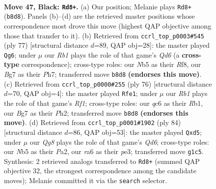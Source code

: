 \documentclass[11pt]{article}
\begin{document}
\clearpage

\begin{figure}[p]\centering
\begin{subfigure}{0.46\textwidth}\centering
\resizebox{\linewidth}{!}{%
\newchessgame
\chessboard[
  setfen={1r4k1/1r3pb1/R1Q5/1n2p1R1/4P3/3K4/3N2N1/6q1 b - - 5 47},
  showmover=false,
  pgfstyle=straightmove, color=movearrow, markmove={b8-d8}
]}
\caption{}
\end{subfigure}\hfill
\begin{subfigure}{0.46\textwidth}\centering
\resizebox{\linewidth}{!}{%
\newchessgame
\chessboard[
  setfen={1r3r1k/Q6p/3p4/4b3/7R/3q1PN1/5RKP/8 b - - 5 39},
  showmover=false,
  pgfstyle=straightmove, color=movearrow, markmove={d3-g6}
]}
\caption{}
\end{subfigure}
\\[4pt]
\begin{subfigure}{0.46\textwidth}\centering
\resizebox{\linewidth}{!}{%
\newchessgame
\chessboard[
  setfen={1b5r/1N2q1k1/p4pp1/5n2/8/2Q5/P5PP/1R3R1K w - - 3 39},
  showmover=false,
  pgfstyle=straightmove, color=movearrow, markmove={f1-e1}
]}
\caption{}
\end{subfigure}\hfill
\begin{subfigure}{0.46\textwidth}\centering
\resizebox{\linewidth}{!}{%
\newchessgame
\chessboard[
  setfen={8/p5rk/2PQ4/3n1p2/5P2/3qp3/P3R1B1/7K w - - 9 43},
  showmover=false,
  pgfstyle=straightmove, color=movearrow, markmove={d6-d5}
]}
\caption{}
\end{subfigure}
\caption{\textbf{Move 47, Black: \texttt{Rd8+}.} (a) Our position; Melanie plays \texttt{Rd8+} (\texttt{b8d8}). Panels (b)--(d) are the retrieved master positions whose correspondence most drove this move (highest QAP objective among those that transfer to it). (b) Retrieved from \texttt{ccrl\_top\_p0003\#545} (ply 77) [structural distance $d$=89, QAP obj=28]: the master played \texttt{Qg6}; under $\mu$ our \emph{Rb1} plays the role of that game's \emph{Qd6} (a \textbf{cross-type} correspondence); cross-type roles: our \emph{N}b5 as their \emph{R}f8, our \emph{B}g7 as their \emph{P}h7; transferred move \texttt{b8d8} \textbf{(endorses this move)}. (c) Retrieved from \texttt{ccrl\_top\_p0000\#255} (ply 76) [structural distance $d$=70, QAP obj=4]: the master played \texttt{Rfe1}; under $\mu$ our \emph{Rb1} plays the role of that game's \emph{Rf1}; cross-type roles: our \emph{q}c6 as their \emph{R}b1, our \emph{B}g7 as their \emph{P}h2; transferred move \texttt{b8d8} \textbf{(endorses this move)}. (d) Retrieved from \texttt{ccrl\_top\_p0001\#1902} (ply 84) [structural distance $d$=86, QAP obj=53]: the master played \texttt{Qxd5}; under $\mu$ our \emph{Qg8} plays the role of that game's \emph{Qd6}; cross-type roles: our \emph{N}b5 as their \emph{P}a2, our \emph{r}a6 as their \emph{p}e3; transferred move \texttt{g1c5}. Synthesis: 2 retrieved analogs transferred to \texttt{Rd8+} (summed QAP objective 32, the strongest correspondence among the candidate moves); Melanie committed it via the \texttt{search} selector.}
\label{fig:thought-m93}
\end{figure}
\end{document}
